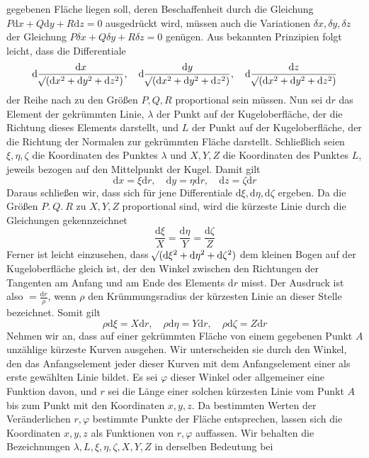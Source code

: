 %
gegebenen Fläche liegen soll, deren Beschaffenheit durch die Gleichung \(P\mathrm{d}x+Q\mathrm{d}y+R\mathrm{d}z=0\) ausgedrückt wird, müssen auch die Variationen \(\delta x,\delta y,\delta z\) der Gleichung \(P\delta x+Q\delta y+R\delta z=0\) genügen. Aus bekannten Prinzipien folgt leicht, dass die Differentiale
\[
\mathrm{d}\frac{\mathrm{d}x}{\mathord{{}^{}\!\surd}(\mathrm{d}x^2+\mathrm{d}y^2+\mathrm{d}z^2)},\quad
\mathrm{d}\frac{\mathrm{d}y}{\mathord{{}^{}\!\surd}(\mathrm{d}x^2+\mathrm{d}y^2+\mathrm{d}z^2)},\quad
\mathrm{d}\frac{\mathrm{d}z}{\mathord{{}^{}\!\surd}(\mathrm{d}x^2+\mathrm{d}y^2+\mathrm{d}z^2)}
\]
der Reihe nach zu den Größen \(P,Q,R\) proportional sein müssen. Nun sei \(\mathrm{d}r\) das Element der gekrümmten Linie, \(\lambda\) der Punkt auf der Kugeloberfläche, der die Richtung dieses Elements darstellt, und \(L\) der Punkt auf der Kugeloberfläche, der die Richtung der Normalen zur gekrümmten Fläche darstellt. Schließlich seien \(\xi,\eta,\zeta\) die Koordinaten des Punktes \(\lambda\) und \(X,Y,Z\) die Koordinaten des Punktes \(L\), jeweils bezogen auf den Mittelpunkt der Kugel. Damit gilt
\[
\mathrm{d}x=\xi\mathrm{d}r,\quad\mathrm{d}y=\eta\mathrm{d}r,\quad\mathrm{d}z=\zeta\mathrm{d}r
\]
Daraus schließen wir, dass sich für jene Differentiale \(\mathrm{d}\xi,\mathrm{d}\eta,\mathrm{d}\zeta\) ergeben. Da die Größen \(P\mathord{.}\ Q\mathord{.}\ R\) zu \(X,Y,Z\) proportional sind, wird die kürzeste Linie durch die Gleichungen gekennzeichnet
\[
\frac{\mathrm{d}\xi}{X}=\frac{\mathrm{d}\eta}{Y}=\frac{\mathrm{d}\zeta}{Z}
\]
Ferner ist leicht einzusehen, dass \(\mathord{{}^{}\!\surd}(\mathrm{d}\xi^2+\mathrm{d}\eta^2+\mathrm{d}\zeta^2)\) dem kleinen Bogen auf der Kugeloberfläche gleich ist, der den Winkel zwischen den Richtungen der Tangenten am Anfang und am Ende des Elements \(\mathrm{d}r\) misst. Der Ausdruck ist also \(=\frac{\mathrm{d}r}{\rho}\), wenn \(\rho\) den Krümmungsradius der kürzesten Linie an dieser Stelle bezeichnet. Somit gilt
\[
\rho\mathrm{d}\xi=X\mathrm{d}r,\quad\rho\mathrm{d}\eta=Y\mathrm{d}r,\quad\rho\mathrm{d}\zeta=Z\mathrm{d}r
\]
Nehmen wir an, dass auf einer gekrümmten Fläche von einem gegebenen Punkt \(A\) unzählige kürzeste Kurven ausgehen. Wir unterscheiden sie durch den Winkel, den das Anfangselement jeder dieser Kurven mit dem Anfangselement einer als erste gewählten Linie bildet. Es sei \(\varphi\) dieser Winkel oder allgemeiner eine Funktion davon, und \(r\) sei die Länge einer solchen kürzesten Linie vom Punkt \(A\) bis zum Punkt mit den Koordinaten \(x,y,z\). Da bestimmten Werten der Veränderlichen \(r,\varphi\) bestimmte Punkte der Fläche entsprechen, lassen sich die Koordinaten \(x,y,z\) als Funktionen von \(r,\varphi\) auffassen. Wir behalten die Bezeichnungen \(\lambda,L,\xi,\eta,\zeta,X,Y,Z\) in derselben Bedeutung bei
